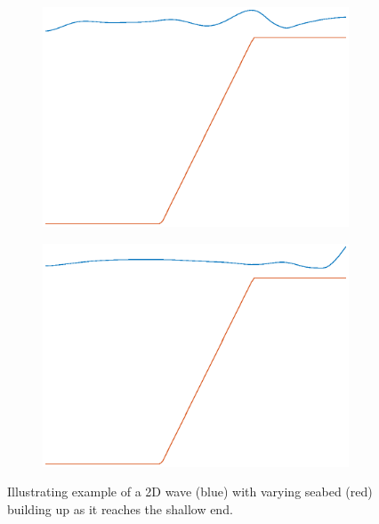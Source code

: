 \documentclass[12pt]{article}
\begin{document}
\begin{figure}[!h]
\begin{subfigure}[b]{0.24\textwidth}
\includegraphics[width=\textwidth]{fig/2dLin3.eps}
\label{fig1}
\end{subfigure}
\begin{subfigure}[b]{0.24\textwidth}
\includegraphics[width=\textwidth]{fig/2dLin4.eps}
\label{fig1}
\end{subfigure}
\caption{Illustrating example of a 2D wave (blue) with varying seabed (red) building up as it reaches the shallow end.}
\label{fig:2dWave}
\end{figure}
\end{document}
